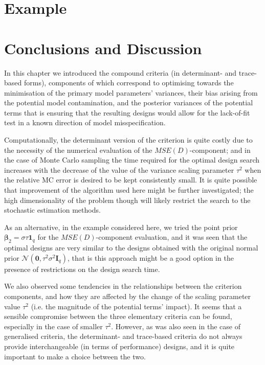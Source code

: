 \section{Example}
\label{sec::mse_example}


\section{Conclusions and Discussion}

In this chapter we introduced the compound criteria (in determinant- and trace-based forms), components of which correspond to optimising towards the minimisation of the primary model parameters' variances, their bias arising from the potential model contamination, and the posterior variances of the potential terms that is ensuring that the resulting designs would allow for the lack-of-fit test in a known direction of model misspecification.

Computationally, the determinant version of the criterion is quite costly due to the necessity of the numerical evaluation of the $MSE(D)$-component; and in the case of Monte Carlo sampling the time required for the optimal design search increases with the decrease of the value of the variance scaling parameter $\tau^2$ when the relative MC error is desired to be kept consistently small. It is quite possible that improvement of the algorithm used here might be further investigated; the high dimensionality of the problem though will likely restrict the search to the stochastic estimation methods. 

As an alternative, in the example considered here, we tried the point prior $\bm{\beta}_2=\sigma\tau\bm{1}_q$ for the $MSE(D)$-component evaluation, and it was seen that the optimal designs are very similar to the designs obtained with the original normal prior $\mathcal{N}(\bm{0},\tau^{2}\sigma^{2}\bm{I}_{q})$, that is this approach might be a good option in the presence of restrictions on the design search time.

We also observed some tendencies in the relationships between the criterion components, and how they are affected by the change of the scaling parameter value $\tau^2$ (i.e. the magnitude of the potential terms' impact). It seems that a sensible compromise between the three elementary criteria can be found, especially in the case of smaller $\tau^2$. However, as was also seen in the case of generalised criteria, the determinant- and trace-based criteria do not always provide interchangeable (in terms of performance) designs, and it is quite important to make a choice between the two. 

